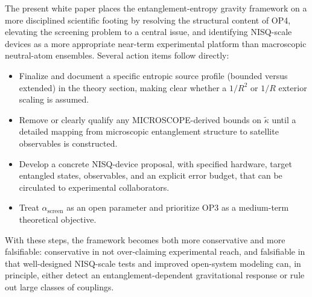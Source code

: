\documentclass[11pt]{article}
\begin{document}
The present white paper places the entanglement-entropy gravity framework on a more disciplined scientific footing by resolving the structural content of OP4, elevating the screening problem to a central issue, and identifying NISQ-scale devices as a more appropriate near-term experimental platform than macroscopic neutral-atom ensembles. Several action items follow directly:
\begin{itemize}
 \item Finalize and document a specific entropic source profile (bounded versus extended) in the theory section, making clear whether a $1/R^2$ or $1/R$ exterior scaling is assumed.
 \item Remove or clearly qualify any MICROSCOPE-derived bounds on $\tilde{\kappa}$ until a detailed mapping from microscopic entanglement structure to satellite observables is constructed.
 \item Develop a concrete NISQ-device proposal, with specified hardware, target entangled states, observables, and an explicit error budget, that can be circulated to experimental collaborators.
 \item Treat $\alpha_{\text{screen}}$ as an open parameter and prioritize OP3 as a medium-term theoretical objective.
\end{itemize}

With these steps, the framework becomes both more conservative and more falsifiable: conservative in not over-claiming experimental reach, and falsifiable in that well-designed NISQ-scale tests and improved open-system modeling can, in principle, either detect an entanglement-dependent gravitational response or rule out large classes of couplings.
\end{document}
